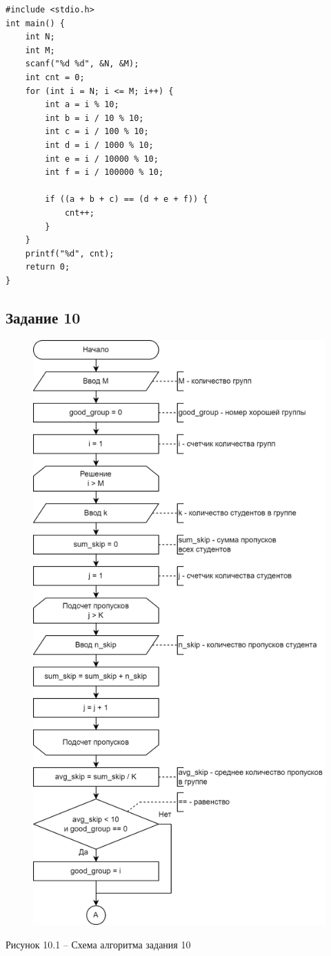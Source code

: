 \documentclass[a4paper,14pt]{extarticle}
\begin{document}
	\begin{lstlisting}
#include <stdio.h>
int main() {
    int N;
    int M;
    scanf("%d %d", &N, &M);
    int cnt = 0;
    for (int i = N; i <= M; i++) {
        int a = i % 10;
        int b = i / 10 % 10;
        int c = i / 100 % 10;
        int d = i / 1000 % 10;
        int e = i / 10000 % 10;
        int f = i / 100000 % 10;

        if ((a + b + c) == (d + e + f)) {
            cnt++;
        }
    }
    printf("%d", cnt);
    return 0;
}
	\end{lstlisting}
	
	\subsection*{Задание 10}
	\begin{figure}[h]
		\centering
		\includegraphics[width=0.6\linewidth]{schemes/t-10-1}
	\end{figure}
	\begin{center}
		Рисунок 10.1 – Схема алгоритма задания 10
	\end{center}
	\pagebreak
\end{document}
